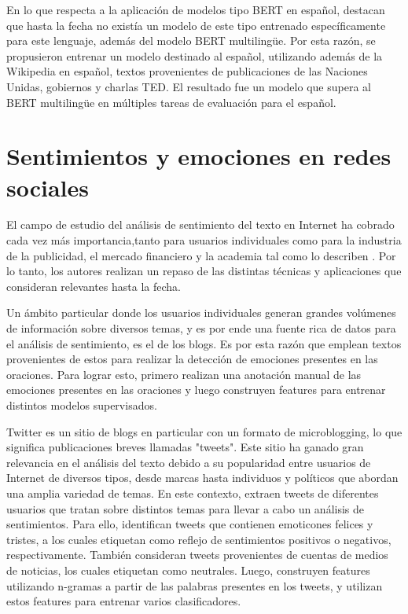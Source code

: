 En lo que respecta a la aplicación de modelos tipo BERT en español, \cite{canete2020spanish} destacan que hasta la fecha no existía un modelo de este tipo entrenado específicamente para este lenguaje, además del modelo BERT multilingüe. Por esta razón, se propusieron entrenar un modelo destinado al español, utilizando además de la Wikipedia en español, textos provenientes de publicaciones de las Naciones Unidas, gobiernos y charlas TED. El resultado fue un modelo que supera al BERT multilingüe en múltiples tareas de evaluación para el español.



\section{Sentimientos y emociones en redes sociales}

El campo de estudio del análisis de sentimiento del texto en Internet ha cobrado cada vez más importancia,tanto para usuarios individuales como para la industria de la publicidad, el mercado financiero y la academia tal como lo describen \cite{pang2008opinion}. Por lo tanto, los autores realizan un repaso de las distintas técnicas y aplicaciones que consideran relevantes hasta la fecha.

Un ámbito particular donde los usuarios individuales generan grandes volúmenes de información sobre diversos temas, y es por ende una fuente rica de datos para el análisis de sentimiento, es el de los blogs. Es por esta razón que \cite{aman2007identifying} emplean textos provenientes de estos para realizar la detección de emociones presentes en las oraciones. Para lograr esto, primero realizan una anotación manual de las emociones presentes en las oraciones y luego construyen features para entrenar distintos modelos supervisados.

Twitter es un sitio de blogs en particular con un formato de microblogging, lo que significa publicaciones breves llamadas "tweets". Este sitio ha ganado gran relevancia en el análisis del texto debido a su popularidad entre usuarios de Internet de diversos tipos, desde marcas hasta individuos y políticos que abordan una amplia variedad de temas. En este contexto, \cite{pak2010twitter} extraen tweets de diferentes usuarios que tratan sobre distintos temas para llevar a cabo un análisis de sentimientos. Para ello, identifican tweets que contienen emoticones felices y tristes, a los cuales etiquetan como reflejo de sentimientos positivos o negativos, respectivamente. También consideran tweets provenientes de cuentas de medios de noticias, los cuales etiquetan como neutrales. Luego, construyen features utilizando n-gramas a partir de las palabras presentes en los tweets, y utilizan estos features para entrenar varios clasificadores.

